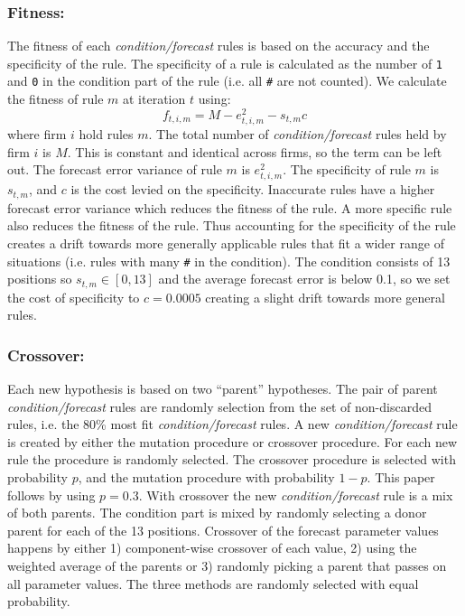 \documentclass[preprint, 12pt]{elsarticle}
\begin{document}
\subsubsection*{Fitness:}

The fitness of each \emph{condition/forecast} rules is based on the accuracy and the specificity of the rule. The specificity of a rule is calculated as the number of \texttt{1} and \texttt{0} in the condition part of the rule (i.e. all \texttt{\#} are not counted). We calculate the fitness of rule $m$ at iteration $t$ using:
\begin{equation}
f_{t,i,m} = M - e^2_{t,i,m} - s_{t,m} c
\end{equation}
where firm $i$ hold rules $m$. The total number of \emph{condition/forecast} rules held by firm $i$ is $M$. This is constant and identical across firms, so the term can be left out. The forecast error variance of rule $m$ is $e^2_{t,i,m}$. The specificity of rule $m$ is $s_{t,m}$, and $c$ is the cost levied on the specificity. Inaccurate rules have a higher forecast error variance which reduces the fitness of the rule. A more specific rule also reduces the fitness of the rule. Thus accounting for the specificity of the rule creates a drift towards more generally applicable rules that fit a wider range of situations (i.e. rules with many \texttt{\#} in the condition). The condition consists of 13 positions so $s_{t,m} \in [0, 13]$ and the average forecast error is below 0.1, so we set the cost of specificity to $c = 0.0005$ creating a slight drift towards more general rules.

\subsubsection*{Crossover:}
Each new hypothesis is based on two ``parent'' hypotheses. The pair of parent \emph{condition/forecast} rules are randomly selection from the set of non-discarded rules, i.e. the 80\% most fit \emph{condition/forecast} rules. A new \emph{condition/forecast} rule is created by either the mutation procedure or crossover procedure. For each new rule the procedure is randomly selected. The crossover procedure is selected with probability $p$, and the mutation procedure with probability $1-p$. This paper follows \citet[chapter~3]{Arthur_2014} by using $p = 0.3$. With crossover the new \emph{condition/forecast} rule is a mix of both parents. The condition part is mixed by randomly selecting a donor parent for each of the 13 positions. Crossover of the forecast parameter values happens by either 1) component-wise crossover of each value, 2) using the weighted average of the parents or 3) randomly picking a parent that passes on all parameter values. The three methods are randomly selected with equal probability.
\end{document}
